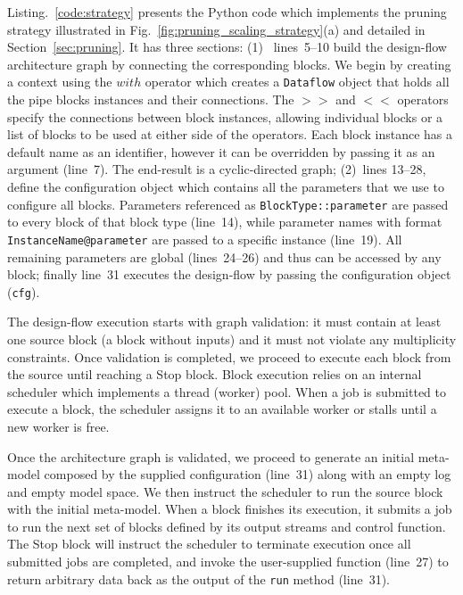 Listing.~\ref{code:strategy} presents the Python code which implements the pruning strategy illustrated in Fig.~\ref{fig:pruning_scaling_strategy}(a) and detailed in Section~\ref{sec:pruning}. It has three sections: (1)~ lines~5--10 build the design-flow architecture graph by connecting the corresponding blocks. We begin by creating a context using the $with$ operator which creates a \texttt{Dataflow} object that holds all the pipe blocks instances and their connections. The $>>$ and $<<$ operators specify the connections between block instances, allowing individual blocks or a list of blocks to be used at either side of the operators. Each block instance has a default name as an identifier, however it can be overridden by passing it as an argument (line~7). The end-result is a cyclic-directed graph; (2)~lines 13--28, define the configuration object which contains all the parameters that we use to configure all blocks. Parameters referenced as \texttt{BlockType::parameter} are passed to every block of that block type (line~14), while parameter names with format \texttt{InstanceName@parameter} are passed to a specific instance (line~19). All remaining parameters are global (lines~24--26) and thus can be accessed by any block; finally line~31 executes the design-flow by passing the configuration object (\texttt{cfg}).




The design-flow execution starts with graph validation: it must contain at least one source block (a block without inputs) and it must not violate any multiplicity constraints. Once validation is completed, we proceed to execute each block from the source until reaching a Stop block. Block execution relies on an internal scheduler which implements a thread (worker) pool. When a job is submitted to execute a block, the scheduler assigns it to an available worker or stalls until a new worker is free. 

Once the architecture graph is validated, we proceed to generate an initial meta-model composed by the supplied configuration (line~31) along with an empty log and empty model space. We then instruct the scheduler to run the source block with the initial meta-model. When a block finishes its execution, it submits a job to run the next set of blocks defined by its output streams and control function. The Stop block will instruct the scheduler to terminate execution once all submitted jobs are completed, and invoke the user-supplied function (line~27) to return arbitrary data back as the output of the \texttt{run} method (line~31). 

